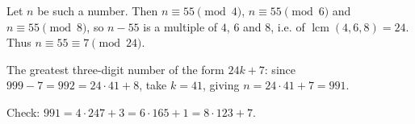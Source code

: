 Let $n$ be such a number. Then $n\equiv55\pmod 4$, $n\equiv55\pmod6$ and $n\equiv55\pmod8$, so $n-55$ is a multiple of $4$, $6$ and $8$, i.e. of $\operatorname{lcm}(4,6,8)=24$. Thus $n\equiv55\equiv7\pmod{24}$.

The greatest three-digit number of the form $24k+7$: since $999-7=992=24\cdot41+8$, take $k=41$, giving $n=24\cdot41+7=\boxed{991}$.

Check: $991=4\cdot247+3=6\cdot165+1=8\cdot123+7$.
